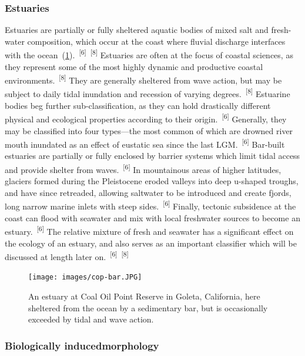 \documentclass{article}
\begin{document}
\subsubsection{Estuaries}


\par{Estuaries are partially or fully sheltered aquatic bodies of mixed salt and fresh-water composition, which occur at the coast where fluvial discharge interfaces with the ocean~(\cref{figure11}).~\textsuperscript{[6]}~\textsuperscript{[8]} Estuaries are often at the focus of coastal sciences, as they represent some of the most highly dynamic and productive coastal environments.~\textsuperscript{[8]} They are generally sheltered from wave action, but may be subject to daily tidal inundation and recession of varying degrees.~\textsuperscript{[8]} Estuarine bodies beg further sub-classification, as they can hold drastically different physical and ecological properties according to their origin.~\textsuperscript{[6]} Generally, they may be classified into four types---the most common of which are drowned river mouth inundated as an effect of eustatic sea since the last LGM.~\textsuperscript{[6]} Bar-built estuaries are partially or fully enclosed by barrier systems which limit tidal access and provide shelter from waves.~\textsuperscript{[6]} In mountainous areas of higher latitudes, glaciers formed during the Pleistocene eroded valleys into deep u-shaped troughs, and have since retreaded, allowing saltwater to be introduced and create fjords, long narrow marine inlets with steep sides.~\textsuperscript{[6]} Finally, tectonic subsidence at the coast can flood with seawater and mix with local freshwater sources to become an estuary.~\textsuperscript{[6]} The relative mixture of fresh and seawater has a significant effect on the ecology of an estuary, and also serves as an important classifier which will be discussed at length later on.~\textsuperscript{[6]}~\textsuperscript{[8]}}


\begin{figure}
    \centering
    \texttt{[image: images/cop-bar.JPG]}
    \caption{An estuary at Coal Oil Point Reserve in Goleta, California, here sheltered from the ocean by a sedimentary bar, but is occasionally exceeded by tidal and wave action.}
    \label{figure11}
\end{figure}

\subsubsection{Biologically inducedmorphology}
\end{document}
